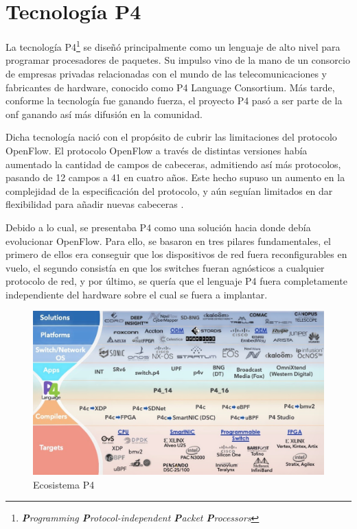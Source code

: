 \section{Tecnología P4}
\label{TecnologiaP4}

La tecnología P4\footnote{\textit{\textbf{P}rogramming \textbf{P}rotocol-independent \textbf{P}acket \textbf{P}rocessors}} se diseñó principalmente como un lenguaje de alto nivel para programar procesadores de paquetes. Su impulso vino de la mano de un consorcio de empresas privadas relacionadas con el mundo de las telecomunicaciones y fabricantes de hardware, conocido como P4 Language Consortium. Más tarde, conforme la tecnología fue ganando fuerza, el proyecto P4 pasó a ser parte de la \gls{onf} ganando así más difusión en la comunidad.\\
\par
Dicha tecnología nació con el propósito de cubrir las limitaciones del protocolo OpenFlow. El protocolo OpenFlow a través de distintas versiones había aumentado la cantidad de campos de cabeceras, admitiendo así más protocolos, pasando de 12 campos a 41 en cuatro años. Este hecho supuso un aumento en la complejidad de la especificación del protocolo, y aún seguían limitados en dar flexibilidad para añadir nuevas cabeceras \cite{2014p4}.\\
\par
Debido a lo cual, se presentaba P4 como una solución hacia donde debía evolucionar OpenFlow. Para ello, se basaron en tres pilares fundamentales, el primero de ellos era conseguir que los dispositivos de red fuera reconfigurables en vuelo, el segundo consistía en que los switches fueran agnósticos a cualquier protocolo de red, y por último, se quería que el lenguaje P4 fuera completamente independiente del hardware sobre el cual se fuera a implantar. 

\begin{figure}[ht]
    \centering
    \includegraphics[width=14.5cm]{archivos/img/teoria/p4resumen_edited2.png}
    \caption{Ecosistema P4}
    \label{fig:p4eco}
\end{figure}

